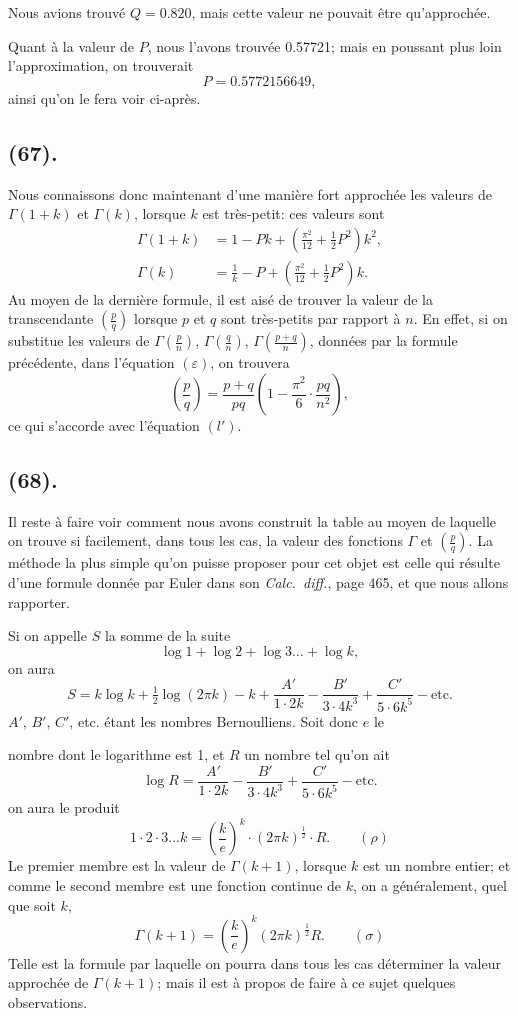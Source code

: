 \documentclass{article}
\begin{document}
Nous avions trouvé $Q=0.820$, mais cette valeur ne pouvait être qu'approchée.

Quant à la valeur de $P$, nous l'avons trouvée 0.57721; mais en poussant plus loin l'approximation, on trouverait
\[ P=0.5772156649, \]
ainsi qu'on le fera voir ci-après.

\subsection*{(67).}

Nous connaissons donc maintenant d'une manière fort approchée les valeurs de $\Gamma(1+k)$ et $\Gamma(k)$, lorsque $k$ est très-petit: ces valeurs sont
\[ \begin{aligned} \Gamma(1+k)&=1-Pk+\left(\tfrac{\pi^{2}}{12}+\tfrac{1}{2}P^{2}\right)k^{2},\\ \Gamma(k)&=\frac{1}{k}-P+\left(\tfrac{\pi^{2}}{12}+\tfrac{1}{2}P^{2}\right)k. \end{aligned} \]
Au moyen de la dernière formule, il est aisé de trouver la valeur de la transcendante $\left(\frac{p}{q}\right)$ lorsque $p$ et $q$ sont très-petits par rapport à $n$. En effet, si on substitue les valeurs de $\Gamma\left(\frac{p}{n}\right)$, $\Gamma\left(\frac{q}{n}\right)$, $\Gamma\left(\frac{p+q}{n}\right)$, données par la formule précédente, dans l'équation $(\varepsilon)$, on trouvera
\[ \left(\frac{p}{q}\right)=\frac{p+q}{pq}\left(1-\frac{\pi^{2}}{6}\cdot\frac{pq}{n^{2}}\right), \]
ce qui s'accorde avec l'équation $(l')$.

\subsection*{(68).}

Il reste à faire voir comment nous avons construit la table au moyen de laquelle on trouve si facilement, dans tous les cas, la valeur des fonctions $\Gamma$ et $\left(\frac{p}{q}\right)$. La méthode la plus simple qu'on puisse proposer pour cet objet est celle qui résulte d'une formule donnée par Euler dans son \emph{Calc.\ diff.}, page 465, et que nous allons rapporter.

Si on appelle $S$ la somme de la suite
\[ \log 1+\log 2+\log 3\ldots+\log k, \]
on aura
\[ S=k\log k+\tfrac{1}{2}\log(2\pi k)-k+\frac{A'}{1\cdot2k}-\frac{B'}{3\cdot4k^{3}}+\frac{C'}{5\cdot6k^{5}}-\text{etc.} \]
$A'$, $B'$, $C'$, etc. étant les nombres Bernoulliens. Soit donc $e$ le

nombre dont le logarithme est 1, et $R$ un nombre tel qu'on ait
\[ \log R=\frac{A'}{1\cdot2k}-\frac{B'}{3\cdot4k^{3}}+\frac{C'}{5\cdot6k^{5}}-\text{etc.} \]
on aura le produit
\[ 1\cdot2\cdot3\ldots k=\left(\frac{k}{e}\right)^{k}\cdot(2\pi k)^{\frac{1}{2}}\cdot R.\qquad(\rho) \]
Le premier membre est la valeur de $\Gamma(k+1)$, lorsque $k$ est un nombre entier; et comme le second membre est une fonction continue de $k$, on a généralement, quel que soit $k$,
\[ \Gamma(k+1)=\left(\frac{k}{e}\right)^{k}(2\pi k)^{\frac{1}{2}}R.\qquad(\sigma) \]
Telle est la formule par laquelle on pourra dans tous les cas déterminer la valeur approchée de $\Gamma(k+1)$; mais il est à propos de faire à ce sujet quelques observations.
\end{document}
